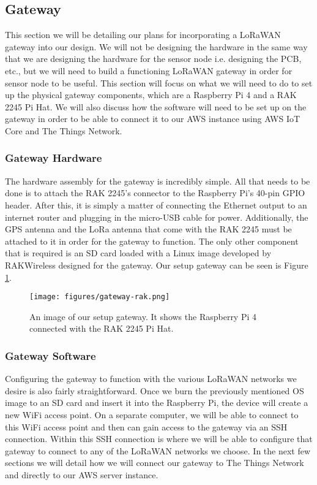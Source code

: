 \subsection{Gateway}
This section we will be detailing our plans for incorporating a LoRaWAN gateway into our design. We will not be designing the hardware in the same way that we are designing the hardware for the sensor node i.e. designing the PCB, etc., but we will need to build a functioning LoRaWAN gateway in order for sensor node to be useful. This section will focus on what we will need to do to set up the physical gateway components, which are a Raspberry Pi 4 and a RAK 2245 Pi Hat. We will also discuss how the software will need to be set up on the gateway in order to be able to connect it to our AWS instance using AWS IoT Core and The Things Network.

\subsubsection{Gateway Hardware}
The hardware assembly for the gateway is incredibly simple. All that needs to be done is to attach the RAK 2245's connector to the Raspberry Pi's 40-pin GPIO header. After this, it is simply a matter of connecting the Ethernet output to an internet router and plugging in the micro-USB cable for power. Additionally, the GPS antenna and the LoRa antenna that come with the RAK 2245 must be attached to it in order for the gateway to function. The only other component that is required is an SD card loaded with a Linux image developed by RAKWireless designed for the gateway. Our setup gateway can be seen is Figure \ref{fig:gateway-rak}.

\begin{figure}
    \centering
    \texttt{[image: figures/gateway-rak.png]}
    \caption{An image of our setup gateway. It shows the Raspberry Pi 4 connected with the RAK 2245 Pi Hat.}
    \label{fig:gateway-rak} 
\end{figure}

\subsubsection{Gateway Software}
Configuring the gateway to function with the various LoRaWAN networks we desire is also fairly straightforward. Once we burn the previously mentioned OS image to an SD card and insert it into the Raspberry Pi, the device will create a new WiFi access point. On a separate computer, we will be able to connect to this WiFi access point and then can gain access to the gateway via an SSH connection. Within this SSH connection is where we will be able to configure that gateway to connect to any of the LoRaWAN networks we choose. In the next few sections we will detail how we will connect our gateway to The Things Network and directly to our AWS server instance.

